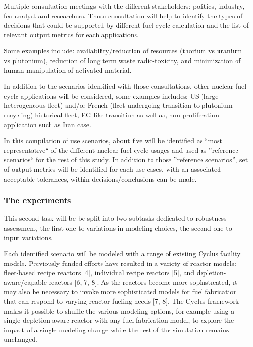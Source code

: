 Multiple consultation meetings with the different stakeholders: politics,
industry, fco analyst and researchers. Those consultation will help to identify
the types of decisions that could be supported by different fuel cycle
calculation and the list of relevant output metrics for each applications. 

Some examples include: availability/reduction of resources (thorium vs uranium
vs plutonium), reduction of long term waste radio-toxicity, and minimization of
human manipulation of activated material.

In addition to the scenarios identified with those consultations, other nuclear
fuel cycle applications will be considered, some examples includes: US (large
heterogeneous fleet) and/or French (fleet undergoing transition to plutonium
recycling) historical fleet, EG-like transition as well as, non-proliferation
application such as Iran case.

In this compilation of use scenarios, about five will be identified as ``most
representative`` of the different nuclear fuel cycle usages and used as
''reference scenarios`` for the rest of this study. In addition to those
''reference scenarios'', set of output metrics will be identified for each use
cases, with an associated acceptable tolerances, within decisions/conclusions
can be made.


\subsubsection{The experiments}

This second task will be be split into two subtasks dedicated to robustness
assessment, the first one to variations in modeling choices, the second one to
input variations.  

Each identified scenario will be modeled with a range of existing Cyclus
facility models.  Previously funded efforts have resulted in a variety of
reactor models: fleet-based recipe reactors [4], individual recipe reactors [5],
and depletion-aware/capable reactors [6, 7, 8].  As the reactors become more
sophisticated, it may also be necessary to invoke more sophisticated models for
fuel fabrication that can respond to varying reactor fueling needs [7, 8]. The
Cyclus framework makes it possible to shuffle the various modeling options, for
example using a single depletion aware reactor with any fuel fabrication model,
to explore the impact of a single modeling change while the rest of the
simulation remains unchanged.  


